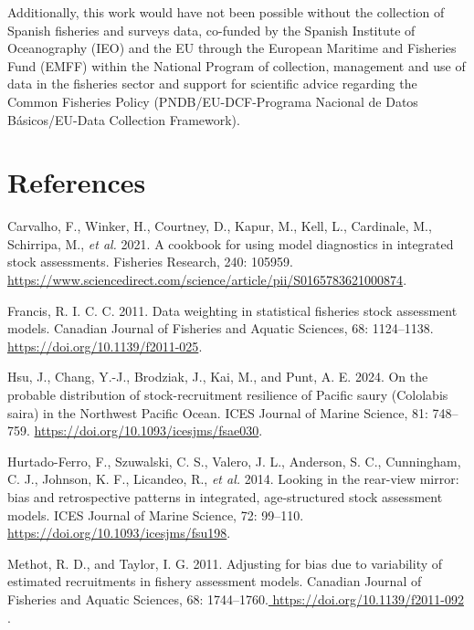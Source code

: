 \documentclass[
]{article}
\newlength{\cslhangindent}
\newlength{\cslentryspacingunit} %
\newenvironment{CSLReferences}[2] %
 {%
  \setlength{\parindent}{0pt}
  \ifodd #1
  \let\oldpar\par
  \def\par{\hangindent=\cslhangindent\oldpar}
  \fi
  \setlength{\parskip}{#2\cslentryspacingunit}
 }%
 {}
\begin{document}
Additionally, this work would have not been possible without the
collection of Spanish fisheries and surveys data, co-funded by the
Spanish Institute of Oceanography (IEO) and the EU through the European
Maritime and Fisheries Fund (EMFF) within the National Program of
collection, management and use of data in the fisheries sector and
support for scientific advice regarding the Common Fisheries Policy
(PNDB/EU-DCF-Programa Nacional de Datos Básicos/EU-Data Collection
Framework).

\hypertarget{references}{%
\section*{References}\label{references}}

\hypertarget{refs}{}
\begin{CSLReferences}{1}{0}
\leavevmode{}%
Carvalho, F., Winker, H., Courtney, D., Kapur, M., Kell, L., Cardinale,
M., Schirripa, M., \emph{et al.} 2021. A cookbook for using model
diagnostics in integrated stock assessments. Fisheries Research, 240:
105959.
\url{https://www.sciencedirect.com/science/article/pii/S0165783621000874}.

\leavevmode{}%
Francis, R. I. C. C. 2011. Data weighting in statistical fisheries stock
assessment models. Canadian Journal of Fisheries and Aquatic Sciences,
68: 1124--1138.\href{\%20https://doi.org/10.1139/f2011-025}{
https://doi.org/10.1139/f2011-025}.

\leavevmode{}%
Hsu, J., Chang, Y.-J., Brodziak, J., Kai, M., and Punt, A. E. 2024. {On
the probable distribution of stock-recruitment resilience of Pacific
saury (Cololabis saira) in the Northwest Pacific Ocean}. ICES Journal of
Marine Science, 81: 748--759.
\url{https://doi.org/10.1093/icesjms/fsae030}.

\leavevmode{}%
Hurtado-Ferro, F., Szuwalski, C. S., Valero, J. L., Anderson, S. C.,
Cunningham, C. J., Johnson, K. F., Licandeo, R., \emph{et al.} 2014.
{Looking in the rear-view mirror: bias and retrospective patterns in
integrated, age-structured stock assessment models}. ICES Journal of
Marine Science, 72: 99--110.
\url{https://doi.org/10.1093/icesjms/fsu198}.

\leavevmode{}%
Methot, R. D., and Taylor, I. G. 2011. Adjusting for bias due to
variability of estimated recruitments in fishery assessment models.
Canadian Journal of Fisheries and Aquatic Sciences, 68:
1744--1760.\href{\%20\%0A\%20\%20\%20\%20\%0A\%20\%20\%20\%20\%20\%20\%20\%20https://doi.org/10.1139/f2011-092\%0A\%20\%20\%20\%20\%0A\%20\%20\%20\%20\%0A\%0A}{
https://doi.org/10.1139/f2011-092 }.


\end{CSLReferences}
\end{document}
